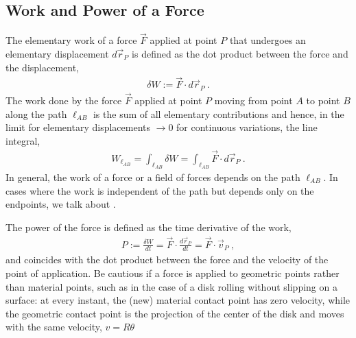 \documentclass[letterpaper,10pt,english]{jupyterBook}
\begin{document}
\subsection{Work and Power of a Force}
\label{\detokenize{ch/actions-work:work-and-power-of-a-force}}
\sphinxAtStartPar
{} The elementary work of a force \(\vec{F}\) applied at point \(P\) that undergoes an elementary displacement \(d \vec{r}_P\) is defined as the dot product between the force and the displacement,
\begin{equation}\label{equation:ch/actions-work:eq:work:diff}
\begin{split}\delta W := \vec{F} \cdot d \vec{r}_P \ .\end{split}
\end{equation}
\sphinxAtStartPar
The work done by the force \(\vec{F}\) applied at point \(P\) moving from point \(A\) to point \(B\) along the path \(\ell_{AB}\) is the sum of all elementary contributions \sphinxhyphen{} and hence, in the limit for elementary displacements \(\rightarrow 0\) for continuous variations, the line integral,
\begin{equation}\label{equation:ch/actions-work:eq:work:int}
\begin{split}W_{\ell_{AB}} = \int_{\ell_{AB}} \delta W = \int_{\ell_{AB}} \vec{F} \cdot d \vec{r}_{P} \ .\end{split}
\end{equation}
\sphinxAtStartPar
In general, the work of a force or a field of forces depends on the path \({\ell}_{AB}\). In cases where the work is independent of the path but depends only on the endpoints, we talk about {\hyperref[\detokenize{ch/actions-conservative:classical-mechanics-actions-conservative}]{}}.

\sphinxAtStartPar
{} The power of the force is defined as the time derivative of the work,
\begin{equation*}
\begin{split}P := \frac{\delta W}{dt} = \vec{F} \cdot \frac{d \vec{r}_P}{d t} = \vec{F} \cdot \vec{v}_P \ , \end{split}
\end{equation*}
\sphinxAtStartPar
and coincides with the dot product between the force and the velocity of the point of application. Be cautious if a force is applied to geometric points rather than material points, such as in the case of a disk rolling without slipping on a surface: at every instant, the (new) material contact point has zero velocity, while the geometric contact point is the projection of the center of the disk and moves with the same velocity, \(v = R \theta\)
\end{document}

